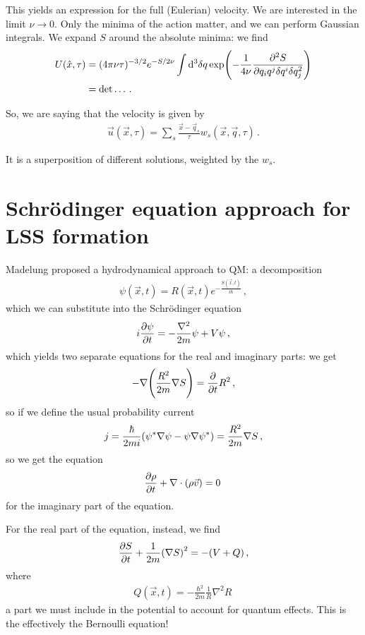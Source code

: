 \documentclass[main.tex]{subfiles}
\begin{document}
This yields an expression for the full (Eulerian) velocity. 
We are interested in the limit \(\nu \to 0 \). Only the minima of the action matter, and we can perform Gaussian integrals. We expand \(S\) around the absolute minima: we find 
%
\begin{align}
U(\hat{x}, \tau ) &= (4 \pi \nu \tau )^{-3/2} e^{-S / 2 \nu }
\int \dd[3]{ \delta q} \exp(- \frac{1}{4 \nu } \pdv[2]{S}{q_{i} q^{j} \delta q^{i} \delta q_{j}})  \\
&= \det \dots
\,.
\end{align}

So, we are saying that the velocity is given by 
%
\begin{align}
\vec{u} (\vec{x}, \tau ) = \sum _{s} \frac{\vec{x} - \vec{q}_{s}}{\tau } w_{s} (\vec{x}, \vec{q}, \tau )
\,.
\end{align}

It is a superposition of different solutions, weighted by the \(w_{s}\).

\section{Schrödinger equation approach for LSS formation}

Madelung proposed a hydrodynamical approach to QM: a decomposition 
%
\begin{align}
\psi (\vec{x}, t) = R (\vec{x}, t) e^{- \frac{S(\vec{x},t)}{i \hbar}}
\,,
\end{align}
%
which we can substitute into the Schrödinger equation 
%
\begin{align}
i \pdv{\psi }{t} = - \frac{\nabla^2}{2m} \psi + V \psi 
\,,
\end{align}
%
which yields two separate equations for the real and imaginary parts: we get 
%
\begin{align}
- \nabla \qty( \frac{R^2}{2m} \nabla S) = \pdv{}{t} R^2
\,,
\end{align}
%
so if we define the usual probability current 
%
\begin{align}
j = \frac{\hbar}{2 m i} \qty(\psi^{*} \nabla \psi - \psi \nabla \psi^{*}) = \frac{R^2}{2m} \nabla S
\,,
\end{align}
%
so we get the equation 
%
\begin{align}
\pdv{\rho }{t} + \nabla \cdot \qty(\rho \vec{v}) = 0
\,
\end{align}
%
for the imaginary part of the equation. 

For the real part of the equation, instead, we find 
%
\begin{align}
\pdv{S}{t} + \frac{1}{2m} \qty(\nabla S)^2 = - (V + Q ) 
\,,
\end{align}
%
where 
%
\begin{align}
Q ( \vec{x}, t) = - \frac{\hbar^2}{2m} \frac{1}{R} \nabla^2 R 
\,
\end{align}
%
a part we must include in the potential to account for quantum effects. 
This is the effectively the Bernoulli equation! 
\end{document}
